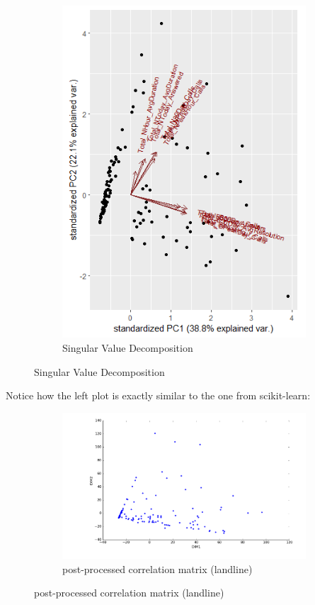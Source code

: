 \documentclass[20pt]{article} %
\begin{document}
\begin{figure}[!htbp]
\begin{subfigure}[p]{0.45\linewidth}
   	\end{subfigure}
   	\begin{subfigure}[p]{0.45\linewidth}
    	\includegraphics[width=\linewidth]{../figures/R/landline_removedoutliers.png}
	\caption{Singular Value Decomposition}
   	\end{subfigure}
\end{figure}

Notice how the left plot is exactly similar to the one from scikit-learn:
\begin{figure}[!htbp]
  	\centering
   	\begin{subfigure}[p]{0.55\linewidth}
    	\includegraphics[width=\linewidth]{../figures/sklearnpca.png}
	\caption{post-processed correlation matrix (landline)}
   	\end{subfigure}
\end{figure} 
\end{document}
